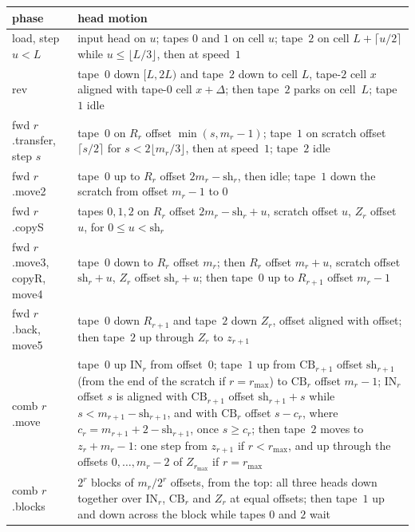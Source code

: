 \begin{center}\small
\begin{longtable}{>{\raggedright\arraybackslash}p{}>{\raggedright\arraybackslash}p{}}
\toprule
phase & head motion \\
\midrule
\endhead
load, step $u<L$ & input head on $u$; tapes $0$ and $1$ on cell $u$; tape~$2$ on cell $L+\lceil u/2\rceil$ while $u\le\lfloor L/3\rfloor$,
then at speed~$1$ \\
rev & tape~$0$ down $[L,2L)$ and tape~$2$ down to cell $L$, tape-$2$ cell $x$ aligned with tape-$0$ cell $x+\Delta$; then tape~$2$
parks on cell~$L$; tape~$1$ idle \\
fwd $r$.transfer, step $s$ & tape~$0$ on $R_r$ offset $\min(s,m_r-1)$; tape~$1$ on scratch offset $\lceil s/2\rceil$ for
$s<2\lfloor m_r/3\rfloor$, then at speed~$1$; tape~$2$ idle \\
fwd $r$.move2 & tape~$0$ up to $R_r$ offset $2m_r-\mathrm{sh}_r$, then idle; tape~$1$ down the scratch from offset $m_r-1$ to $0$ \\
fwd $r$.copyS & tapes $0,1,2$ on $R_r$ offset $2m_r-\mathrm{sh}_r+u$, scratch offset $u$, $Z_r$ offset $u$, for $0\le u<\mathrm{sh}_r$ \\
fwd $r$.move3, copyR, move4 & tape~$0$ down to $R_r$ offset $m_r$; then $R_r$ offset $m_r+u$, scratch offset $\mathrm{sh}_r+u$, $Z_r$
offset $\mathrm{sh}_r+u$; then tape~$0$ up to $R_{r+1}$ offset $m_r-1$ \\
fwd $r$.back, move5 & tape~$0$ down $R_{r+1}$ and tape~$2$ down $Z_r$, offset aligned with offset; then tape~$2$ up through $Z_r$ to
$z_{r+1}$ \\
comb $r$.move & tape~$0$ up $\mathrm{IN}_r$ from offset~$0$; tape~$1$ up from $\mathrm{CB}_{r+1}$ offset $\mathrm{sh}_{r+1}$ (from the
end of the scratch if $r=r_{\max}$) to $\mathrm{CB}_r$ offset $m_r-1$; $\mathrm{IN}_r$ offset $s$ is aligned with $\mathrm{CB}_{r+1}$
offset $\mathrm{sh}_{r+1}+s$ while $s<m_{r+1}-\mathrm{sh}_{r+1}$, and with $\mathrm{CB}_r$ offset $s-c_r$, where
$c_r=m_{r+1}+2-\mathrm{sh}_{r+1}$, once $s\ge c_r$; then tape~$2$ moves to $z_r+m_r-1$: one step from $z_{r+1}$ if $r<r_{\max}$, and up
through the offsets $0,\dots,m_r-2$ of $Z_{r_{\max}}$ if $r=r_{\max}$ \\
comb $r$.blocks & $2^r$ blocks of $m_r/2^r$ offsets, from the top: all three heads down together over $\mathrm{IN}_r$, $\mathrm{CB}_r$
and $Z_r$ at equal offsets; then tape~$1$ up and down across the block while tapes $0$ and $2$ wait \\

\end{longtable}
\end{center}
